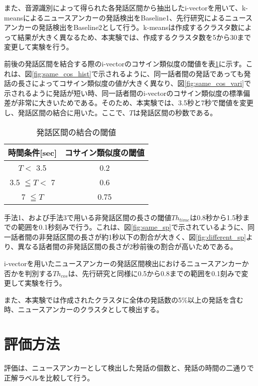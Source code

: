 また、音源識別によって得られた各発話区間から抽出したi-vectorを用いて、k-meansによるニュースアンカーの発話検出をBaseline1、先行研究\cite{nozaki_gakuseikai}によるニュースアンカーの発話検出をBaseline2として行う。k-meansは作成するクラスタ数によって結果が大きく異なるため、本実験では、作成するクラスタ数を5から30まで変更して実験を行う。


前後の発話区間を結合する際のi-vectorのコサイン類似度の閾値を表\ref{table:decide_thcos}に示す。これは、図\ref{fig:same_cos_hist}で示されるように、同一話者間の発話であっても発話の長さによってコサイン類似度の値が大きく異なり、図\ref{fig:same_cos_vari}で示されるように発話が短い時、同一話者間のi-vectorのコサイン類似度の標準偏差が非常に大きいためである。そのため、本実験では、3.5秒と7秒で閾値を変更し、発話区間の結合に用いた。ここで、$T$は発話区間の秒数である。

\begin{table}[H]
  \begin{center}
    \caption{発話区間の結合の閾値 \label{table:decide_thcos}}
    \begin{tabular}{|c||c|} \hline
時間条件[sec] & コサイン類似度の閾値  \\ \hline
$T <$ 3.5 &  0.2 \\ \hline
3.5 $\leqq T <$ 7 &  0.6  \\ \hline
7 $\leqq T$ &  0.75 \\ \hline
    \end{tabular}
  \end{center}
\end{table}

手法1、および手法3で用いる非発話区間の長さの閾値$Th_{time}$は0.8秒から1.5秒までの範囲を0.1秒刻みで行う。これは、図\ref{fig:same_sp}で示されているように、同一話者間の非発話区間の長さが約1秒以下の割合が大きく、図\ref{fig:different_sp}より、異なる話者間の非発話区間の長さが2秒前後の割合が高いためである。\par
i-vectorを用いたニュースアンカーの発話区間検出におけるニュースアンカーか否かを判別する$Th_{cos}$は、先行研究\cite{nozaki_gakuseikai}と同様に0.5から0.8までの範囲を0.1刻みで変更して実験を行う。\par

また、本実験では作成されたクラスタに全体の発話数の5\%以上の発話を含む時、ニュースアンカーのクラスタとして検出する。

\section{評価方法}
評価は、ニュースアンカーとして検出した発話の個数と、発話の時間の二通りで正解ラベルを比較して行う。

